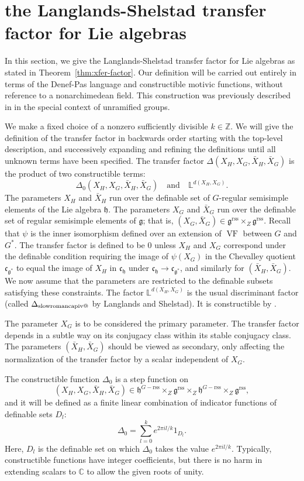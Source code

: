 \documentclass[12pt]{amsart}
\makeatletter
\newcommand*{\rom}[1]{\text{\expandafter\@slowromancap\romannumeral #1@}}
\newcommand{\op}[1]{\operatorname{#1}}
\newcommand{\ring}[1]{{\mathbb #1}}
\def\VF{{\op{VF}}}
\newcommand{\fg}{\mathfrak{g}}
\newcommand{\fc}{\mathfrak{c}}
\newcommand{\fh}{\mathfrak{h}}
\newcommand{\reg}{\mathrm{rss}}
\theoremstyle{plain}
\theoremstyle{definition}
\makeatother
\begin{document}
\section{the Langlands-Shelstad transfer factor for Lie algebras}

In this section, we give the Langlands-Shelstad transfer factor for
Lie algebras as stated in Theorem~\ref{thm:xfer-factor}.  Our definition will be
carried out entirely in terms of the Denef-Pas language and
constructible motivic functions, without reference to a nonarchimedean
field.  This construction was previously described in \cite{CHL} in
the special context of unramified groups.

We make a fixed choice of a nonzero sufficiently divisible
$k\in\ring{Z}$.  We will give the definition of the transfer factor in
backwards order starting with the top-level description, and
successively expanding and refining the definitions until all unknown
terms have been specified.  The transfer factor $\Delta(X_H,X_G,\bar
X_H,\bar X_G)$ is the product of two constructible terms:
\[
\Delta_0(X_H,X_G,\bar
X_H,\bar X_G)\quad\text{and}\quad \ring{L}^{d(X_H,X_G)}.
\]
The parameters $X_H$ and $\bar X_H$ run over the definable set of
$G$-regular semisimple elements of the Lie algebra $\fh$.  The
parameters $X_G$ and $\bar X_G$ run over the definable set of regular
semisimple elements of $\fg$; that is, $(X_G,\bar X_G)\in
\fg^\reg\times_Z\fg^\reg$.  Recall that $\psi$ is the inner isomorphism
defined over an extension of $\VF$ between $G$ and $G^*$.  The
transfer factor is defined to be $0$ unless $X_H$ and $X_G$ correspond
under the definable condition requiring the image of $\psi(X_G)$ in
the Chevalley quotient $\fc_{\fg^*}$ to equal the image of $X_H$ in
$\fc_{\fh}$ under $\fc_{\fh}\to\fc_{\fg^*}$, and similarly for $(\bar
X_H,\bar X_G)$.  We now assume that the parameters are restricted to
the definable subsets satisfying these constraints.  The factor
$\ring{L}^{d(X_H,X_G)}$ is the usual discriminant factor (called
$\Delta_{\rom4}$ by Langlands and Shelstad).  It is constructible by
\cite{CHL}.

The parameter $X_G$ is to be considered the primary parameter.  The
transfer factor depends in a subtle way on its conjugacy class within
its stable conjugacy class. The parameters $(\bar X_H,\bar X_G)$
should be viewed as secondary, only affecting the normalization of the
transfer factor by a scalar independent of $X_G$.

The constructible function $\Delta_0$ is a step function on 
\[
(X_H,X_G,\bar X_H,\bar X_G)\in \fh^{G-\reg}\times_Z\fg^\reg\times_Z \fh^{G-\reg}\times_Z\fg^\reg,
\] and it will
be defined as a finite linear combination of indicator functions of
definable sets $D_l$:
\[
\Delta_0 = \sum_{l=0}^k e^{2\pi i l/k}
1_{D_l }.
\]
Here, $D_l$ is the definable set on which $\Delta_0$ takes the value
$e^{2\pi i l/k}$.  Typically, constructible functions have integer
coefficients, but there is no harm in extending scalars to $\ring{C}$
to allow the given roots of unity.
\end{document}
